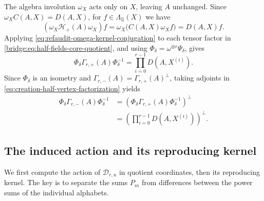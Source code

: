 \documentclass[12pt,reqno,a4paper]{amsart}
\numberwithin{equation}{section}
\numberwithin{figure}{section}
\theoremstyle{plain}
\theoremstyle{definition}
\begin{document}
The algebra involution $\omega_X$ acts only on $X$, leaving $A$
unchanged.  Since $\omega_X C(A,X)=D(A,X)$, for
$f\in\Lambda_{\mathbb Q}(X)$ we have
\begin{equation}\label{eq:refaudit-omega-kernel-conjugation}
 (\omega_X\mathcal H_+(A)\omega_X)f
 =\omega_X\bigl(C(A,X)\omega_X f\bigr)
 =D(A,X)f.
\end{equation}
Applying
\eqref{eq:refaudit-omega-kernel-conjugation} to each tensor
factor in \eqref{bridge:eq:half-fields-core-quotient}, and using
$\Phi_\delta=\omega^{\otimes r}\Psi_\delta$, gives
\begin{equation}\label{eq:creation-half-vertex-factorization}
 \Phi_\delta\Gamma_{r,+}(A)\Phi_\delta^{-1}
 =\prod_{i=0}^{r-1}D(A,X^{(i)}).
\end{equation}
Since $\Phi_\delta$ is an isometry and
$\Gamma_{r,-}(A)=\Gamma_{r,+}(A)^\perp$, taking adjoints in
\eqref{eq:creation-half-vertex-factorization} yields
\begin{equation}\label{eq:annihilation-half-vertex-factorization}
\begin{aligned}
 \Phi_\delta\Gamma_{r,-}(A)\Phi_\delta^{-1}
 &=\left(\Phi_\delta\Gamma_{r,+}(A)\Phi_\delta^{-1}\right)^\perp\\
 &=\left(\prod_{i=0}^{r-1}D(A,X^{(i)})\right)^\perp.
\end{aligned}
\end{equation}

\subsection{The induced action and its reproducing kernel}
\label{subsec:general-action-spectra}

We first compute the action of $\mathcal D_{r,u}$ in quotient
coordinates, then its reproducing kernel.  The key is to separate
the sums $P_m$ from differences between the power sums of the
individual alphabets.
\end{document}

